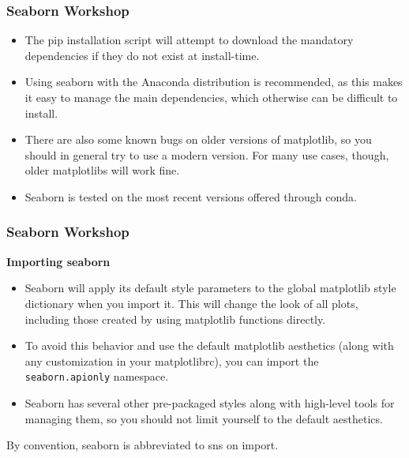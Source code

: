\documentclass{beamer}
\begin{document}
\begin{frame}
\frametitle{Seaborn Workshop}
\large
\begin{itemize}
\item The pip installation script will attempt to download the mandatory dependencies if they do not exist at install-time.
	
\item Using seaborn with the Anaconda distribution is recommended, as this makes it easy to manage the main dependencies, which otherwise can be difficult to install.
	
	
\item There are also some known bugs on older versions of matplotlib, so you should in general try to use a modern version. For many use cases, though, older matplotlibs will work fine.
	
\item Seaborn is tested on the most recent versions offered through conda.
	
\end{itemize}
\end{frame}
\begin{frame}
\frametitle{Seaborn Workshop}
\large

\noindent \textbf{Importing seaborn}
\begin{itemize}
\item	Seaborn will apply its default style parameters to the global matplotlib style dictionary when you import it. This will change the look of all plots, including those created by using matplotlib functions directly. 
\item To avoid this behavior and use the default matplotlib aesthetics (along with any customization in your matplotlibrc), you can import the \texttt{seaborn.apionly} namespace.
	
\item Seaborn has several other pre-packaged styles along with high-level tools for managing them, so you should not limit yourself to the default aesthetics.
	
\end{itemize}

By convention, seaborn is abbreviated to sns on import.
\end{frame}
\end{document}
